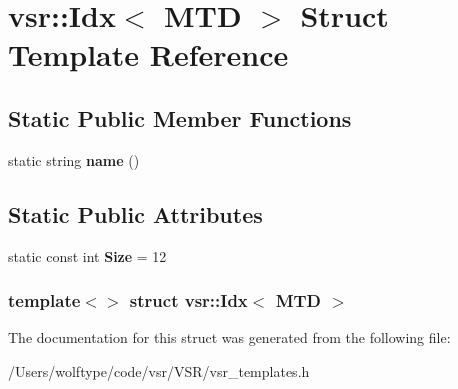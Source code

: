 \hypertarget{structvsr_1_1_idx_3_01_m_t_d_01_4}{\section{vsr\-:\-:Idx$<$ M\-T\-D $>$ Struct Template Reference}
\label{structvsr_1_1_idx_3_01_m_t_d_01_4}
}
\subsection*{Static Public Member Functions}
\begin{DoxyCompactItemize}
\item 
\hypertarget{structvsr_1_1_idx_3_01_m_t_d_01_4_af430b614968d9f2f0a020b008d15a75a}{static string {\bfseries name} ()}\label{structvsr_1_1_idx_3_01_m_t_d_01_4_af430b614968d9f2f0a020b008d15a75a}

\end{DoxyCompactItemize}
\subsection*{Static Public Attributes}
\begin{DoxyCompactItemize}
\item 
\hypertarget{structvsr_1_1_idx_3_01_m_t_d_01_4_a070a434aff6752656c208b74d81f13ff}{static const int {\bfseries Size} = 12}\label{structvsr_1_1_idx_3_01_m_t_d_01_4_a070a434aff6752656c208b74d81f13ff}

\end{DoxyCompactItemize}
\subsubsection*{template$<$$>$ struct vsr\-::\-Idx$<$ M\-T\-D $>$}



The documentation for this struct was generated from the following file\-:\begin{DoxyCompactItemize}
\item 
/\-Users/wolftype/code/vsr/\-V\-S\-R/vsr\-\_\-templates.\-h\end{DoxyCompactItemize}
